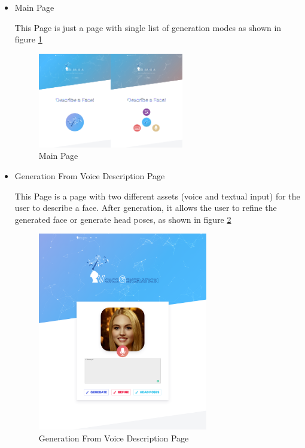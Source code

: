 \begin{itemize}
    \item Main Page
    
    This Page is just a page with single list of generation modes as shown in figure \ref{fig:main}
    
    \begin{figure}[H]
        \centering
        \includegraphics[width=0.6\textwidth]{images/website/mainpage.jpg}
        \caption{Main Page}
        \label{fig:main}
    \end{figure}
    
    \item Generation From Voice Description Page
    
    This Page is a page with two different assets (voice and textual input) for the user to describe a face. After generation, it allows the user to refine the generated face or generate head poses, as shown in figure \ref{fig:voice}
    
    \begin{figure}[H]
        \centering
        \includegraphics[width=0.7\textwidth]{images/website/voice.png}
        \caption{Generation From Voice Description Page}
        \label{fig:voice}
    \end{figure}
    

\end{itemize}
